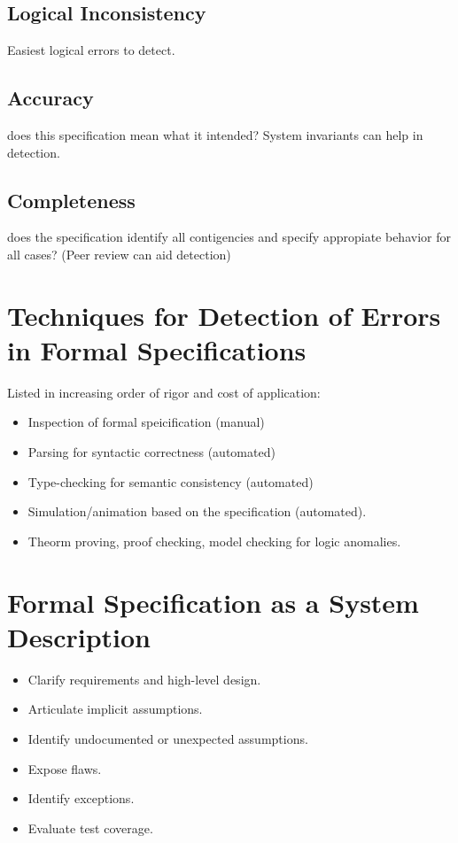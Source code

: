 \documentclass{article}
\begin{document}
    \subsection{Logical Inconsistency}
    Easiest logical errors to detect.\\
    \subsection{Accuracy}
    does this specification mean what it intended? System invariants can help in detection.\\
    \subsection{Completeness}
    does the specification identify all contigencies and specify appropiate behavior for all cases? (Peer review can aid detection)\\
    \section{Techniques for Detection of Errors in Formal Specifications}
    Listed in increasing order of rigor and cost of application:\begin{itemize}
        \item Inspection of formal speicification (manual)
        \item Parsing for syntactic correctness (automated)
        \item Type-checking for semantic consistency (automated)
        \item Simulation/animation based on the specification (automated). 
        \item Theorm proving, proof checking, model checking for logic anomalies.
    \end{itemize}
    \section{Formal Specification as a System Description}
    \begin{itemize}
        \item Clarify requirements and high-level design.
        \item Articulate implicit assumptions.
        \item Identify undocumented or unexpected assumptions.
        \item Expose flaws.
        \item Identify exceptions.
        \item Evaluate test coverage.
    \end{itemize}
\end{document}
